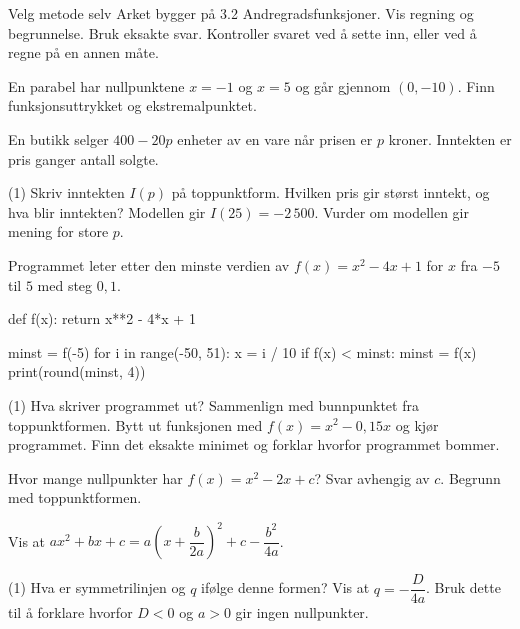 
\begin{infoboks}{Velg metode selv}
Arket bygger på 3.2 Andregradsfunksjoner. Vis regning og begrunnelse. Bruk eksakte svar.
Kontroller svaret ved å sette inn, eller ved å regne på en annen måte.
\end{infoboks}


En parabel har nullpunktene $x = -1$ og $x = 5$ og går gjennom $(0, -10)$. Finn funksjonsuttrykket og ekstremalpunktet.

En butikk selger $400 - 20p$ enheter av en vare når prisen er $p$ kroner. Inntekten er pris ganger antall solgte.
\begin{tasks}(1)
  \task Skriv inntekten $I(p)$ på toppunktform. Hvilken pris gir størst inntekt, og hva blir inntekten?
  \task Modellen gir $I(25) = -2\,500$. Vurder om modellen gir mening for store $p$.
\end{tasks}

Programmet leter etter den minste verdien av $f(x) = x^2 - 4x + 1$ for $x$ fra $-5$ til $5$ med steg $0{,}1$.
\begin{kode}
def f(x):
    return x**2 - 4*x + 1

minst = f(-5)
for i in range(-50, 51):
    x = i / 10
    if f(x) < minst:
        minst = f(x)
print(round(minst, 4))
\end{kode}
\begin{tasks}(1)
  \task Hva skriver programmet ut? Sammenlign med bunnpunktet fra toppunktformen.
  \task Bytt ut funksjonen med $f(x) = x^2 - 0{,}15x$ og kjør programmet. Finn det eksakte minimet og forklar hvorfor programmet bommer.
\end{tasks}


Hvor mange nullpunkter har $f(x) = x^2 - 2x + c$? Svar avhengig av $c$. Begrunn med toppunktformen.

Vis at $ax^2 + bx + c = a\left(x + \dfrac{b}{2a}\right)^2 + c - \dfrac{b^2}{4a}$.
\begin{tasks}(1)
  \task Hva er symmetrilinjen og $q$ ifølge denne formen?
  \task Vis at $q = -\dfrac{D}{4a}$. Bruk dette til å forklare hvorfor $D < 0$ og $a > 0$ gir ingen nullpunkter.
\end{tasks}

